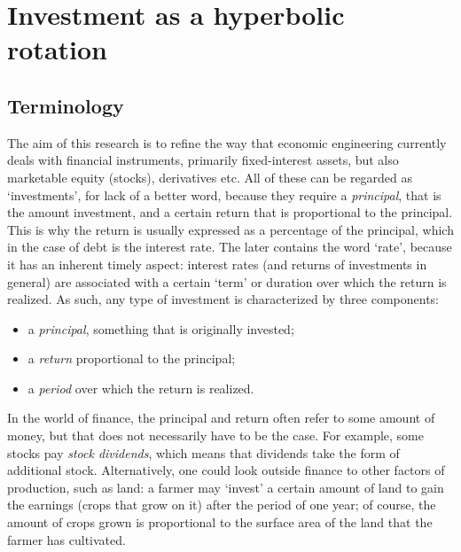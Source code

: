 \chapter{Investment as a hyperbolic rotation}
\label{chap:finance_rotation}

\section{Terminology}
The aim of this research is to refine the way that economic engineering currently deals with financial instruments, primarily fixed-interest assets, but also marketable equity (stocks), derivatives etc. All of these can be regarded as `investments', for lack of a better word, because they require a \emph{principal}, that is the amount investment, and a certain return that is proportional to the principal. This is why the return is usually expressed as a percentage of the principal, which in the case of debt is the interest rate. The later contains the word `rate', because it has an inherent timely aspect: interest rates (and returns of investments in general) are associated with a certain `term' or duration over which the return is realized. As such, any type of investment is characterized by three components:
\begin{itemize}
    \item a \emph{principal}, something that is originally invested;
    \item a \emph{return} proportional to the principal;
    \item a \emph{period} over which the return is realized.
\end{itemize}
In the world of finance, the principal and return often refer to some amount of money, but that does not necessarily have to be the case. For example, some stocks pay \emph{stock dividends}, which means that dividends take the form of additional stock. Alternatively, one could look outside finance to other factors of production, such as land: a farmer may `invest' a certain amount of land to gain the earnings (crops that grow on it) after the period of one year; of course, the amount of crops grown is proportional to the surface area of the land that the farmer has cultivated.

